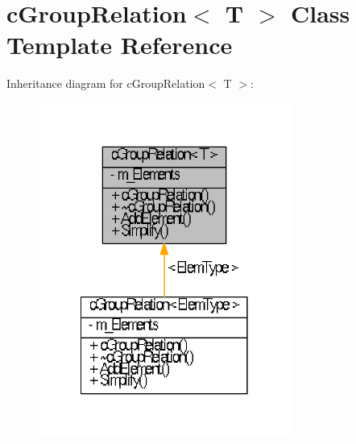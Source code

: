 \hypertarget{classcGroupRelation}{\section{c\-Group\-Relation$<$ \-T $>$ \-Class \-Template \-Reference}
\label{classcGroupRelation}
}


\-Inheritance diagram for c\-Group\-Relation$<$ \-T $>$\-:\nopagebreak
\begin{figure}[H]
\begin{center}
\leavevmode
\includegraphics[width=234pt]{classcGroupRelation__inherit__graph}
\end{center}
\end{figure}


